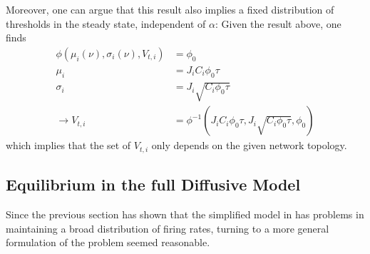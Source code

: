 \documentclass[10pt,a4paper]{article}
\begin{document}
Moreover, one can argue that this result also implies a fixed distribution of thresholds in the steady state, independent of $\alpha$: Given the result above, one finds
\begin{align}
\phi \left( \mu_i(\nu),\sigma_i \left( \nu \right) ,V_{t,i} \right) &= \phi_0 \label{fixed_thresh_dist_argument1} \\
\mu_i &= J_iC_i \phi_0 \tau \label{fixed_thresh_dist_argument2} \\
\sigma_i &= J_i\sqrt{C_i \phi_0  \tau} \label{fixed_thresh_dist_argument3} \\
\rightarrow V_{t,i} &= {\phi}^{-1} \left( J_iC_i \phi_0 \tau,J_i\sqrt{C_i \phi_0  \tau},\phi_0 \right) \label{fixed_thresh_dist_argument4}
\end{align}
which implies that the set of $V_{t,i}$ only depends on the given network topology.

\subsection{Equilibrium in the full Diffusive Model} \label{Matrix_Diff_Model_Section}
Since the previous section has shown that the simplified model in \cite{Sweeney_Paper} has problems in maintaining a broad distribution of firing rates, turning to a more general formulation of the problem seemed reasonable.
\end{document}
